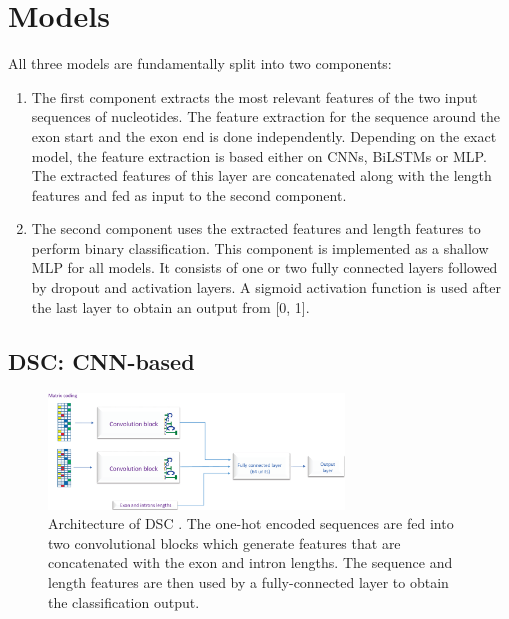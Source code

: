 \section{Models} \label{sec:models}
All three models are fundamentally split into two components: 
\begin{enumerate}
	\item The first component extracts the most relevant features of the two input sequences of nucleotides. The feature extraction for the sequence around the exon start and the exon end is done independently. Depending on the exact model, the feature extraction is based either on CNNs, BiLSTMs or MLP. The extracted features of this layer are concatenated along with the length features and fed as input to the second component.
	
	\item The second component uses the extracted features and length features to perform binary classification. This component is implemented as a shallow MLP for all models. It consists of one or two fully connected layers followed by dropout and activation layers. A sigmoid activation function is used after the last layer to obtain an output from [0, 1].
\end{enumerate}

\subsection{DSC: CNN-based} \label{subsec:dsc}

\begin{figure}
	\centering\includegraphics[width=0.7\textwidth]{../visualizations/ch4-methods/dsc_architecture.png} 
	\caption{
		Architecture of DSC \cite{dsc}. The one-hot encoded sequences are fed into two convolutional blocks which generate features that are concatenated with the exon and intron lengths. The sequence and length features are then used by a fully-connected layer to obtain the classification output.
	}
	\label{fig:dsc_architecture}
\end{figure}

